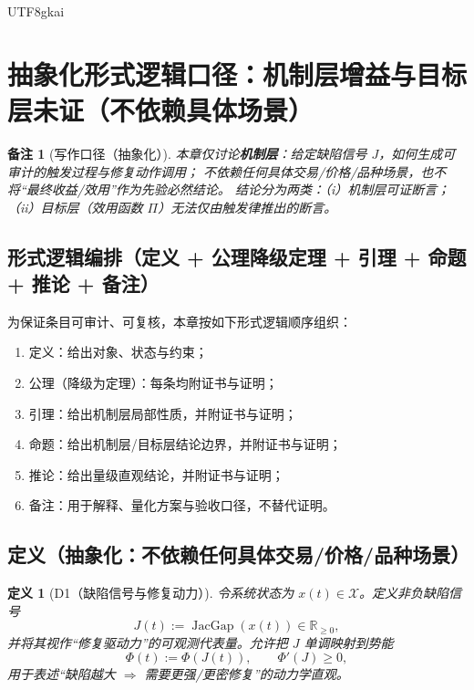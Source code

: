 \documentclass[12pt]{article}
\newtheorem{definition}{定义}[section]
\newtheorem{remark}{备注}[section]
\newcommand{\RR}{\mathbb{R}}
\newcommand{\JacGap}{\operatorname{JacGap}}
\begin{document}
\begin{CJK*}{UTF8}{gkai}
\clearpage

\section{抽象化形式逻辑口径：机制层增益与目标层未证（不依赖具体场景）}
\label{sec:tex28-ch5}

\begin{remark}[写作口径（抽象化）]
本章仅讨论\textbf{机制层}：给定缺陷信号 $J$，如何生成可审计的触发过程与修复动作调用；
不依赖任何具体交易/价格/品种场景，也不将“最终收益/效用”作为先验必然结论。
结论分为两类：（i）机制层可证断言；（ii）目标层（效用函数 $\Pi$）无法仅由触发律推出的断言。
\end{remark}

\subsection{形式逻辑编排（定义 + 公理降级定理 + 引理 + 命题 + 推论 + 备注）}
\label{subsec:tex28-ch5-logic-structure}

为保证条目可审计、可复核，本章按如下形式逻辑顺序组织：
\begin{enumerate}
  \item 定义：给出对象、状态与约束；
  \item 公理（降级为定理）：每条均附证书与证明；
  \item 引理：给出机制层局部性质，并附证书与证明；
  \item 命题：给出机制层/目标层结论边界，并附证书与证明；
  \item 推论：给出量级直观结论，并附证书与证明；
  \item 备注：用于解释、量化方案与验收口径，不替代证明。
\end{enumerate}

\subsection{定义（抽象化：不依赖任何具体交易/价格/品种场景）}
\label{subsec:tex28-ch5-defs}

\begin{definition}[D1（缺陷信号与修复动力）]
\label{def:tex28-ch5-d1}
令系统状态为 $x(t)\in\mathcal{X}$。定义非负缺陷信号
\[
  J(t):=\JacGap(x(t))\in\RR_{\ge 0},
\]
并将其视作“修复驱动力”的可观测代表量。允许把 $J$ 单调映射到势能
\[
  \Phi(t):=\Phi(J(t)),
  \qquad
  \Phi'(J)\ge 0,
\]
用于表述“缺陷越大 $\Rightarrow$ 需要更强/更密修复”的动力学直观。
\end{definition}


\end{CJK*}
\end{document}

